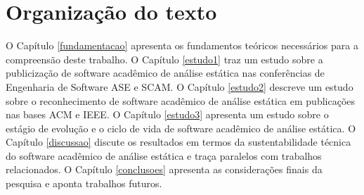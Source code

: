 \section{Organização do texto}

O Capítulo \ref{fundamentacao} apresenta os fundamentos teóricos necessários
para a compreensão deste trabalho. O Capítulo \ref{estudo1} traz um estudo
sobre a publicização de software acadêmico de análise estática nas conferências
de Engenharia de Software ASE e SCAM. O Capítulo \ref{estudo2} descreve um
estudo sobre o reconhecimento de software acadêmico de análise estática em
publicações nas bases ACM e IEEE. O Capítulo \ref{estudo3} apresenta um estudo
sobre o estágio de evolução e o ciclo de vida de software acadêmico de análise
estática. O Capítulo \ref{discussao} discute os resultados em termos da
sustentabilidade técnica do software acadêmico de análise estática e traça
paralelos com trabalhos relacionados. O Capítulo \ref{conclusoes} apresenta as
considerações finais da pesquisa e aponta trabalhos futuros.
